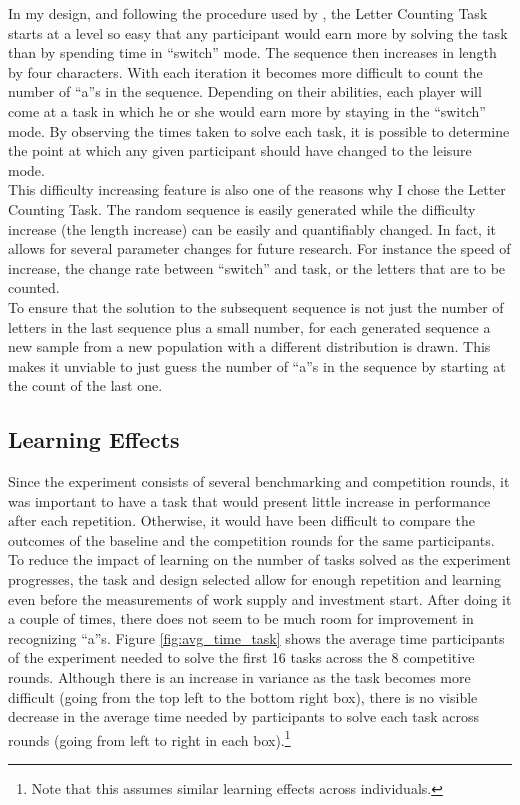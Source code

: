     In my design, and following the procedure used by \citeauthor{sausgruberForthcoming}, the Letter Counting Task starts at a level so easy that any participant would earn more by solving the task than by spending time in ``switch'' mode. The sequence then increases in length by four characters. With each iteration it becomes more difficult to count the number of ``a''s in the sequence. Depending on their abilities, each player will come at a task in which he or she would earn more by staying in the ``switch'' mode. By observing the times taken to solve each task, it is possible to determine the point at which any given participant should have changed to the leisure mode.\\
    
    This difficulty increasing feature is also one of the reasons why I chose the Letter Counting Task. The random sequence is easily generated while the difficulty increase (the length increase) can be easily and quantifiably changed. In fact, it allows for several parameter changes for future research. For instance the speed of increase, the change rate between ``switch'' and task, or the letters that are to be counted.\\
    
    To ensure that the solution to the subsequent sequence is not just the number of letters in the last sequence plus a small number, for each generated sequence a new sample from a new population with a different distribution is drawn. This makes it unviable to just guess the number of ``a''s in the sequence by starting at the count of the last one.
    
        
    \subsection{Learning Effects}
    Since the experiment consists of several benchmarking and competition rounds, it was important to have a task that would present little increase in performance after each repetition. Otherwise, it would have been difficult to compare the outcomes of the baseline and the competition rounds for the same participants.\\
    
    To reduce the impact of learning on the number of tasks solved as the experiment progresses, the task and design selected allow for enough repetition and learning even before the measurements of work supply and investment start. 
    After doing it a couple of times, there does not seem to be much room for improvement in recognizing ``a''s. Figure \ref{fig:avg_time_task} shows the average time participants of the experiment needed to solve the first 16 tasks across the 8 competitive rounds. Although there is an increase in variance as the task becomes more difficult (going from the top left to the bottom right box), there is no visible decrease in the average time needed by participants to solve each task across rounds (going from left to right in each box).\footnote{Note that this assumes similar learning effects across individuals.} 
    
